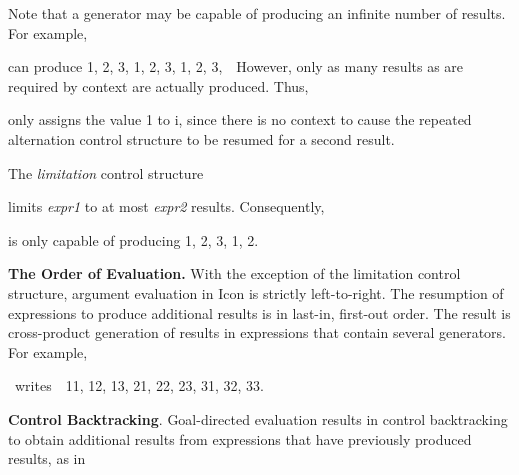 Note that a generator may be capable of producing an infinite number
of results. For example,



\noindent can produce 1, 2, 3, 1, 2, 3, 1, 2, 3,\ \ However, only as
many results as are required by context are actually produced. Thus,



\noindent only assigns the value 1 to i, since there is no context to
cause the repeated alternation control structure to be resumed for a
second result.

The \textit{limitation }control structure



\noindent
limits \textit{expr1 }to at most \textit{expr2 }results. Consequently,



is only capable of producing 1, 2, 3, 1, 2.

\textbf{The Order of Evaluation.} With the exception of the limitation
control structure, argument evaluation in Icon is strictly
left-to-right. The resumption of expressions to produce additional
results is in last-in, first-out order. The result is
{\textquotedbl}cross-product{\textquotedbl} generation of results in
expressions that contain several generators. For example,




\ writes\ \ 11, 12, 13, 21, 22, 23, 31, 32, 33.


\textbf{Control Backtracking}. Goal-directed evaluation results in
control backtracking to obtain additional results from expressions
that have previously produced results, as in



